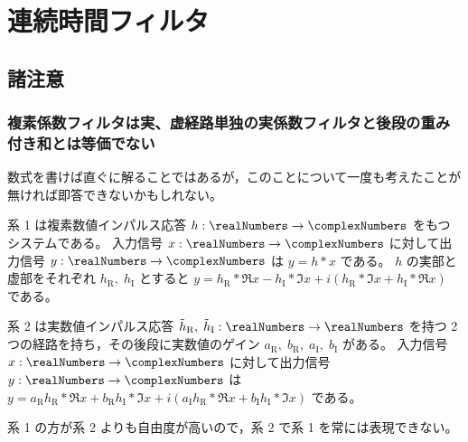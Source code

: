 \chapter{連続時間フィルタ}
    \section{諸注意}
        \subsection{複素係数フィルタは実、虚経路単独の実係数フィルタと後段の重み付き和とは等価でない}
            数式を書けば直ぐに解ることではあるが，このことについて一度も考えたことが無ければ即答できないかもしれない。
            \par
            系 1 は複素数値インパルス応答 $h:\realNumbers\to\complexNumbers$ をもつシステムである。
            入力信号 $x:\realNumbers\to\complexNumbers$ に対して出力信号 $y:\realNumbers\to\complexNumbers$ は $y = h*x$ である。
            $h$ の実部と虚部をそれぞれ $h_\text{R},\;h_\text{I}$ とすると $y = h_\text{R}*\Re{x} - h_\text{I}*\Im{x} + i(h_\text{R}*\Im{x} + h_\text{I}*\Re{x})$ である。
            \par
            系 2 は実数値インパルス応答 $\tilde{h}_\text{R},\;\tilde{h}_\text{I}:\realNumbers\to\realNumbers$ を持つ 2 つの経路を持ち，その後段に実数値のゲイン $a_\text{R},\;b_\text{R},\;a_\text{I},\;b_\text{I}$ がある。
            入力信号 $x:\realNumbers\to\complexNumbers$ に対して出力信号 $y:\realNumbers\to\complexNumbers$ は $y = a_\text{R}h_\text{R}*\Re{x} + b_\text{R}h_\text{I}*\Im{x} + i(a_\text{I}h_\text{R}*\Re{x} + b_\text{I}h_\text{I}*\Im{x})$ である。
            \par
            系 1 の方が系 2 よりも自由度が高いので，系 2 で系 1 を常には表現できない。